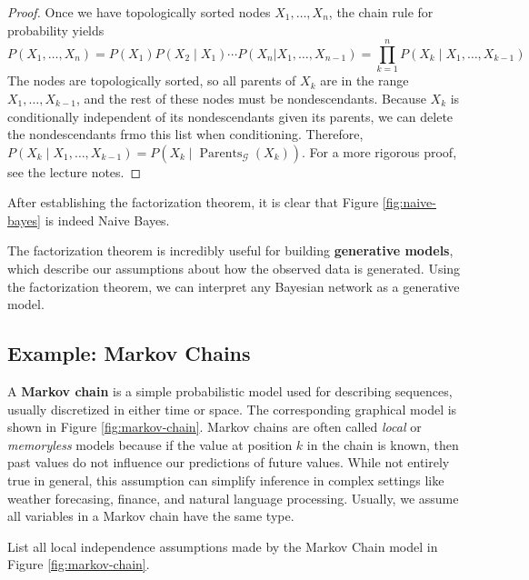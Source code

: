 \documentclass{discussion}
\DeclareMathOperator{\Parents}{Parents}
\newcommand{\G}{\mathcal{G}}
\begin{document}
\begin{proof}
Once we have topologically sorted nodes $X_1, \dots, X_n$, the chain rule for probability yields
    \begin{equation*}
    P(X_1,\dots,X_n)
    = P(X_1) P(X_2 \mid X_1) \cdots P(X_n | X_1, \dots, X_{n-1})
    = \prod_{k=1}^n P(X_k \mid X_1, \dots, X_{k-1})
    \end{equation*}
The nodes are topologically sorted, so all parents of $X_k$ are in the range $X_1, \dots, X_{k-1}$, and the rest of these nodes must be nondescendants.  Because $X_k$ is conditionally independent of its nondescendants given its parents, we can delete the nondescendants frmo this list when conditioning.  Therefore, $P(X_k \mid X_1, \dots, X_{k-1}) = P(X_k \mid \Parents_\G(X_k))$.  For a more rigorous proof, see the lecture notes.
\end{proof}

\begin{example}
After establishing the factorization theorem, it is clear that Figure \ref{fig:naive-bayes} is indeed Naive Bayes.
\end{example}

The factorization theorem is incredibly useful for building \textbf{generative models}, which describe our assumptions about how the observed data is generated.  Using the factorization theorem, we can interpret any Bayesian network as a generative model.

\subsection{Example:  Markov Chains}

A \textbf{Markov chain} is a simple probabilistic model used for describing sequences, usually discretized in either time or space.  The corresponding graphical model is shown in Figure \ref{fig:markov-chain}.  Markov chains are often called \textit{local} or \textit{memoryless} models because if the value at position $k$ in the chain is known, then past values do not influence our predictions of future values.  While not entirely true in general, this assumption can simplify inference in complex settings like weather forecasing, finance, and natural language processing.  Usually, we assume all variables in a Markov chain have the same type.

\begin{exercise}
List all local independence assumptions made by the Markov Chain model in Figure \ref{fig:markov-chain}.
\end{exercise}
\end{document}

